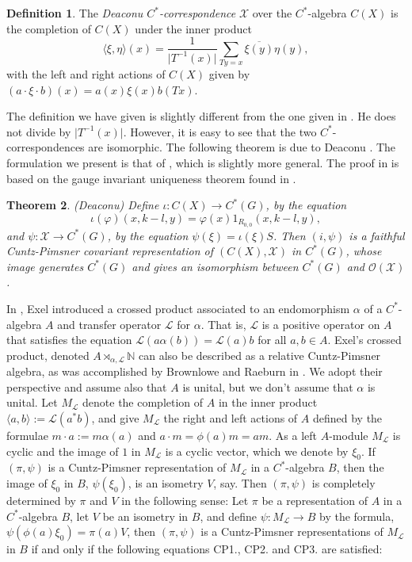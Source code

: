 \documentclass{amsproc}
\theoremstyle{plain}
\newtheorem{thm}{Theorem}[section]
\theoremstyle{definition}
\theoremstyle{definition}
\newtheorem{defn}[thm]{Definition}
\theoremstyle{remark}
\theoremstyle{plain}
\begin{document}
\begin{defn}
The \emph{Deaconu $C^{*}$-correspondence} $\mathcal{X}$ over the
$C^{\ast}$-algebra $C(X)$ is the completion of $C(X)$ under the
inner product\[
\langle\xi,\eta\rangle(x)=\frac{1}{\vert
T^{-1}(x)\vert}\sum_{Ty=x}\overline{\xi(y)}\eta(y),\]
 with the left and right actions of $C(X)$ given by $(a\cdot\xi\cdot
b)(x)=a(x)\xi(x)b(Tx)$. 

The definition we have given is slightly different from the one given
in \cite{vD99}. He does not divide by $\vert T^{-1}(x)\vert$. However,
it is easy to see that the two $C^{*}$-correspondences are isomorphic.
The following theorem is due to Deaconu \cite[Propositions 3.1 and 3.3]{vD99}.
The formulation we present is that of \cite[Theorem 7]{DKM01}, which
is slightly more general. The proof in \cite{DKM01} is based on the
gauge invariant uniqueness theorem found in \cite[Theorem 4.1]{FMR03}.
\end{defn}
\begin{thm}
\label{DeaconuIsoThm}(Deaconu) Define $\iota:C(X)\to C^{\ast}(G)$,
by the equation \[
\iota(\varphi)(x,k-l,y)=\varphi(x)1_{R_{0,0}}(x,k-l,y),\]
 and $\psi:\mathcal{X}\to C^{*}(G)$, by the equation $\psi(\xi)=\iota(\xi)S$.
Then $(i,\psi)$ is a faithful Cuntz-Pimsner covariant representation
of $(C(X),\mathcal{X})$ in $C^{\ast}(G)$, whose image generates
$C^{*}(G)$ and gives an isomorphism between $C^{*}(G)$ and
$\mathcal{O}(\mathcal{X})$. 
\end{thm}
In \cite{rE03}, Exel introduced a crossed product associated to an
endomorphism $\alpha$ of a $C^{*}$-algebra $A$ and transfer operator
$\mathcal{L}$ for $\alpha$. That is, $\mathcal{L}$ is a positive
operator on $A$ that satisfies the equation
$\mathcal{L}(a\alpha(b))=\mathcal{L}(a)b$
for all $a,b\in A$. Exel's crossed product, denoted
$A\rtimes_{\alpha,\mathcal{L}}\mathbb{N}$
$ $can also be described as a relative Cuntz-Pimsner algebra, as
was accomplished by Brownlowe and Raeburn in \cite{BR06}. We adopt
their perspective and assume also that $A$ is unital, but we don't
assume that $\alpha$ is unital. Let $M_{\mathcal{L}}$ denote the
completion of $A$ in the inner product $\langle
a,b\rangle:=\mathcal{L}(a^{*}b)$,
and give $M_{\mathcal{L}}$ the right and left actions of $A$ defined
by the formulae $m\cdot a:=m\alpha(a)$ and $a\cdot m=\phi(a)m=am$.
As a left $A$-module $M_{\mathcal{L}}$ is cyclic and the image of
$1$ in $M_{\mathcal{L}}$ is a cyclic vector, which we denote by
$\xi_{0}$. If $(\pi,\psi)$ is a Cuntz-Pimsner representation of
$M_{\mathcal{L}}$ in a $C^{*}$-algebra $B$, then the image of $\xi_{0}$
in $B$, $\psi(\xi_{0})$, is an isometry $V$, say. Then $(\pi,\psi)$
is completely determined by $\pi$ and $V$ in the following sense:
Let $\pi$ be a representation of $A$ in a $C^{*}$-algebra $B$,
let $V$ be an isometry in $B$, and define $\psi:M_{\mathcal{L}}\to B$
by the formula, $\psi(\phi(a)\xi_{0})=\pi(a)V$, then $(\pi,\psi)$
is a Cuntz-Pimsner representations of $M_{\mathcal{L}}$ in $B$ if
and only if the following equations CP1., CP2. and CP3. are satisfied:
\end{document}
